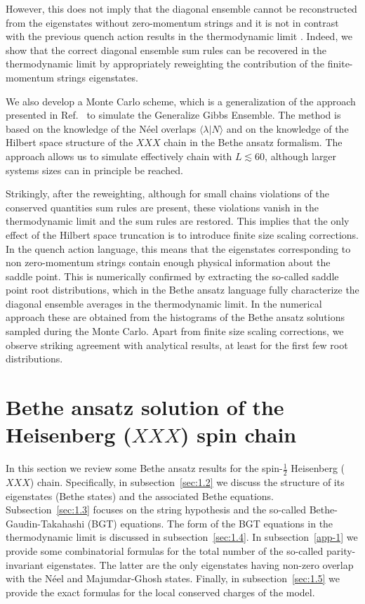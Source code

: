 \documentclass[11pt]{iopart}
\begin{document}
However, this does not imply that the diagonal ensemble cannot be reconstructed  
from the eigenstates without zero-momentum strings and it is not in contrast 
with the previous quench action results in the thermodynamic limit \cite{wouters-2014A,pozsgay-2014A}.
Indeed, we show  that the correct diagonal ensemble 
sum rules can be recovered in the thermodynamic limit by appropriately 
reweighting the contribution of the finite-momentum strings eigenstates.  

We also develop a Monte Carlo scheme, which is a generalization of 
the approach presented in Ref.~\cite{alba-2015} to simulate the Generalize 
Gibbs Ensemble. The method is based on the knowledge of the N\'eel overlaps 
$\langle\lambda|N\rangle$ and on the knowledge of the Hilbert space structure 
of the $XXX$ chain in the Bethe ansatz formalism. The approach allows us to 
simulate effectively chain with $L\lesssim 60$, although larger systems 
sizes can in principle be reached. 

Strikingly, after the reweighting, although for small chains violations of 
the conserved quantities sum rules are present, these violations vanish in the 
thermodynamic limit and the sum rules are restored. This implies that the only 
effect of the Hilbert space truncation is to introduce finite size scaling corrections. 
In the quench action language, this means that the eigenstates corresponding to non 
zero-momentum strings contain enough physical information about the saddle point. 
This is numerically confirmed by extracting the so-called saddle point 
root distributions, which in the Bethe ansatz language fully characterize 
the diagonal ensemble averages in the thermodynamic limit. In the numerical  
 approach these are obtained from the histograms of the Bethe ansatz 
solutions sampled during the Monte Carlo. Apart from finite size scaling 
corrections, we observe striking agreement with analytical results, at least 
for the first few root distributions. 


\section{Bethe ansatz solution of the Heisenberg ($XXX$) spin chain}
\label{sec:1}

In this section we review some Bethe ansatz results for the spin-$\frac{1}{2}$ Heisenberg 
($XXX$) chain. Specifically, in subsection~\ref{sec:1.2} we discuss the structure of  
its eigenstates (Bethe states) and the associated Bethe equations. 
Subsection~\ref{sec:1.3} focuses on the string hypothesis 
and the so-called Bethe-Gaudin-Takahashi (BGT) equations. 
The form of the BGT equations in the thermodynamic limit is discussed in subsection~\ref{sec:1.4}. 
In subsection~\ref{app-1} we provide some combinatorial formulas for the total 
number of the so-called parity-invariant eigenstates. The latter are the only eigenstates 
having non-zero overlap with the N\'eel and Majumdar-Ghosh states. 
Finally, in subsection~\ref{sec:1.5} we provide the exact formulas for the 
local conserved charges of the model. 
\end{document}
